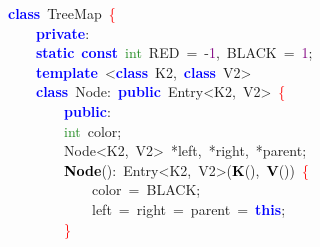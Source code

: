 \begin{center}\begin{minipage}{120mm}
\noindent
\mbox{}\textbf{\textcolor{Blue}{class}}\ \textcolor{TealBlue}{TreeMap}\ \textcolor{Red}{\{} \\
\mbox{}\ \ \ \ \textbf{\textcolor{Blue}{private}}\textcolor{BrickRed}{:} \\
\mbox{}\ \ \ \ \textbf{\textcolor{Blue}{static}}\ \textbf{\textcolor{Blue}{const}}\ \textcolor{ForestGreen}{int}\ RED\ \textcolor{BrickRed}{=}\ \textcolor{BrickRed}{-}\textcolor{Purple}{1}\textcolor{BrickRed}{,}\ BLACK\ \textcolor{BrickRed}{=}\ \textcolor{Purple}{1}\textcolor{BrickRed}{;}\  \\
\mbox{}\ \ \ \ \textbf{\textcolor{Blue}{template}}\ \textcolor{BrickRed}{\textless{}}\textbf{\textcolor{Blue}{class}}\ \textcolor{TealBlue}{K2}\textcolor{BrickRed}{,}\ \textbf{\textcolor{Blue}{class}}\ \textcolor{TealBlue}{V2}\textcolor{BrickRed}{\textgreater{}} \\
\mbox{}\ \ \ \ \textbf{\textcolor{Blue}{class}}\ \textcolor{TealBlue}{Node}\textcolor{BrickRed}{:}\ \textbf{\textcolor{Blue}{public}}\ Entry\textcolor{BrickRed}{\textless{}}K2\textcolor{BrickRed}{,}\ V2\textcolor{BrickRed}{\textgreater{}}\ \textcolor{Red}{\{} \\
\mbox{}\ \ \ \ \ \ \ \ \textbf{\textcolor{Blue}{public}}\textcolor{BrickRed}{:} \\
\mbox{}\ \ \ \ \ \ \ \ \textcolor{ForestGreen}{int}\ color\textcolor{BrickRed}{;} \\
\mbox{}\ \ \ \ \ \ \ \ \textcolor{TealBlue}{Node\textless{}K2,\ V2\textgreater{}}\ \textcolor{BrickRed}{*}left\textcolor{BrickRed}{,}\ \textcolor{BrickRed}{*}right\textcolor{BrickRed}{,}\ \textcolor{BrickRed}{*}parent\textcolor{BrickRed}{;} \\
\mbox{}\ \ \ \ \ \ \ \ \textbf{\textcolor{Black}{Node}}\textcolor{BrickRed}{():}\ Entry\textcolor{BrickRed}{\textless{}}K2\textcolor{BrickRed}{,}\ V2\textcolor{BrickRed}{\textgreater{}(}\textbf{\textcolor{Black}{K}}\textcolor{BrickRed}{(),}\ \textbf{\textcolor{Black}{V}}\textcolor{BrickRed}{())}\ \textcolor{Red}{\{} \\
\mbox{}\ \ \ \ \ \ \ \ \ \ \ \ color\ \textcolor{BrickRed}{=}\ BLACK\textcolor{BrickRed}{;} \\
\mbox{}\ \ \ \ \ \ \ \ \ \ \ \ left\ \textcolor{BrickRed}{=}\ right\ \textcolor{BrickRed}{=}\ parent\ \textcolor{BrickRed}{=}\ \textbf{\textcolor{Blue}{this}}\textcolor{BrickRed}{;} \\
\mbox{}\ \ \ \ \ \ \ \ \textcolor{Red}{\}} \\

\end{minipage}
\end{center}
